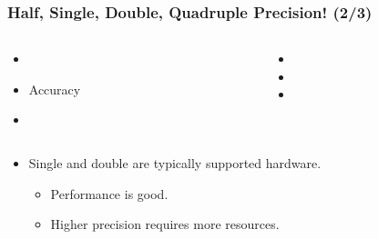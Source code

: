 \begin{frame}

\frametitle{Half, Single, Double, Quadruple Precision! (2/3)}

\begin{columns}[t]

\begin{column}{0.5\textwidth}

\begin{itemize}

\item {}

\item Accuracy

\item {}

\end{itemize}

\end{column}

\begin{column}{0.5\textwidth}

\begin{itemize}

\item {}

\item {}

\item {}

\end{itemize}

\end{column}

\end{columns}

\vspace{\fill}

\begin{itemize}

\item<2-> Single and double are typically supported hardware.

\begin{itemize}

\item Performance is good.

\item Higher precision requires more resources.


\end{itemize}
\end{itemize}
\end{frame}
